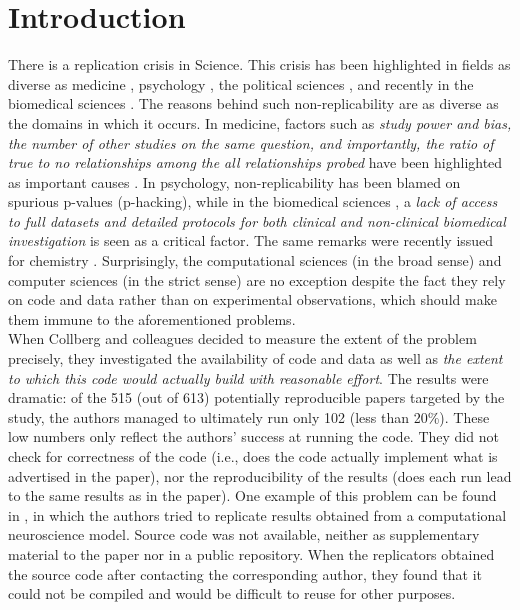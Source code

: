 \documentclass[a4paper,10pt, twocolumn]{article}
\begin{document}
\clearpage
\section*{Introduction}
There is a replication crisis in Science. This crisis has been
highlighted in fields as diverse as medicine \citep{ioannidis:2005},
psychology \citep{nosek:2015}, the political sciences \citep{janz:2015},
and recently in the biomedical sciences \citep{iqbal:2016}. The reasons
behind such non-replicability are as diverse as the domains in which it occurs.
In medicine, factors such as {\em study power and bias, the
number of other studies on the same question, and importantly, the
ratio of true to no relationships among the all relationships probed}
have been highlighted as important causes \citep{ioannidis:2005}. 
In psychology, non-replicability has been blamed on spurious p-values (p-hacking),
while in the biomedical sciences \citep{iqbal:2016},
a {\em lack of access to full datasets and detailed protocols for both
clinical and non-clinical biomedical investigation} is seen as a
critical factor.
The same remarks were recently issued for chemistry \citep{coudert:2017}.
Surprisingly, the computational sciences (in the broad
sense) and computer sciences (in the strict sense) are no exception \citep{donoho:2009,Manninen:2017} despite the fact they rely on code and data rather than on experimental observations, which should make them immune to the aforementioned problems.\\

When Collberg and colleagues \citep{collberg:2014, collberg:2015} decided to measure the extent of the problem
precisely, they investigated the availability of code and data as well as {\em the extent to which this code would actually build with reasonable
  effort}. The results were dramatic: of the 515 (out of 613) potentially reproducible
papers targeted by the study, the authors managed to ultimately run
only 102 (less than 20\%).
These low numbers only reflect the authors' success at running the code.
They did not check for correctness of the code (i.e., does the code actually implement what is advertised in the paper), nor the reproducibility of the results (does each run lead to the same results as in the paper).
One example of this problem can be found in \citet{topalidou:2015a}, in which the authors tried to replicate results obtained from a computational neuroscience model.
Source code was not available, neither as supplementary material to the paper nor in a public repository.
When the replicators obtained the source code after contacting the corresponding author, they found that it could not be compiled and would be difficult to reuse for other purposes.\\
\end{document}
